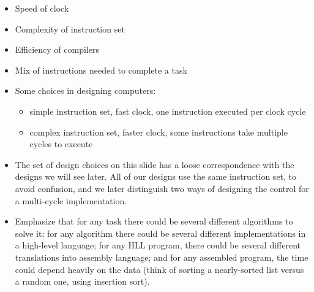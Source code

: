 \begin{frame}[fragile]
\begin{itemize}
	\item Speed of clock
	\item Complexity of instruction set
	\item Efficiency of compilers
	\item Mix of instructions needed to complete a task
	\item Some choices in designing computers:
	\begin{itemize}
		\item simple instruction set, fast clock, one instruction
		executed per clock cycle
		\item complex instruction set, faster clock, some instructions
		take multiple cycles to execute
	\end{itemize}
\end{itemize}
\BNotes\ifnum{}
{
\begin{itemize}
\item The set of design choices on this slide has a loose
correspondence with the designs we will see later. All of our designs
use the same instruction set, to avoid confusion, and we later
distinguish two ways of designing the control for a multi-cycle
implementation. 
\item Emphasize that for any task there could be several
different algorithms to solve it; for any algorithm there could be
several different implementations in a high-level language; for any
HLL program, there could be several different translations into
assembly language; and for any assembled program, the time could
depend heavily on the data (think of sorting a nearly-sorted list
versus a random one, using insertion sort).
\end{itemize}
}
\fi\ENotes
\end{frame}


